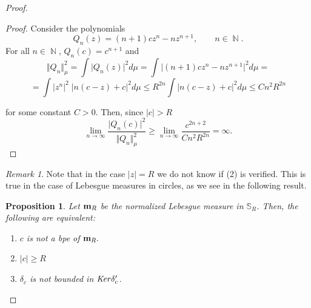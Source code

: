 \documentclass[12pt]{amsart}
\theoremstyle{definition}
\theoremstyle{plain}
\newtheorem{prop}{Proposition}
\theoremstyle{remark}
\newtheorem{remark}{Remark}
\DeclareMathOperator{\NN}{\mathbb N}
\begin{document}
\begin{proof}
\begin{proof}
\noindent Consider the polynomials 
$$
Q_n(z)=(n+1)cz^n-nz^{n+1}, \qquad n\in \NN.
$$
\noindent For all $n\in \NN$, $Q_n(c)=c^{n+1}$ and 
$$
\Vert Q_n \Vert^2_{\mu}= \int \vert Q_n(z) \vert^2 d\mu= \int \vert (n+1)cz^n-nz^{n+1} \vert^2 d\mu=
$$
$$
=  \int \vert z^n\vert^2 \; \vert  n(c-z)+c\vert^2d\mu\leq R^{2n}\int \vert  n(c-z)+c\vert^2d\mu \leq Cn^2R^{2n}
$$

\noindent for some constant $C>0$.
\noindent Then, since $\vert c \vert >R$
$$
\lim_{n\to \infty} \dfrac{\vert Q_n(c) \vert^2}{\Vert Q_n \Vert^2_{\mu}} \geq \lim_{n\to \infty} \dfrac{c^{2n+2}}{Cn^2R^{2n
}}= \infty.
$$














\end{proof}

\begin{remark} Note that in the case $\vert z \vert =R$ we do not know if (2) is verified. This is true in the case of Lebesgue measures in circles, as we see in the following result. 
\end{remark}

\begin{prop} Let ${\bf m}_R$ be the normalized Lebesgue measure in $\mathbb{S}_R$. Then, the following are equivalent: 
\begin{enumerate}
    \item $c$ is not a bpe of ${\bf m}_R.$
    \item $\vert c \vert \geq R$
    \item $\delta_c$ is not bounded in ${\it Ker} \delta'_c$.
\end{enumerate}
 
\end{prop}


\end{proof}
\end{document}
